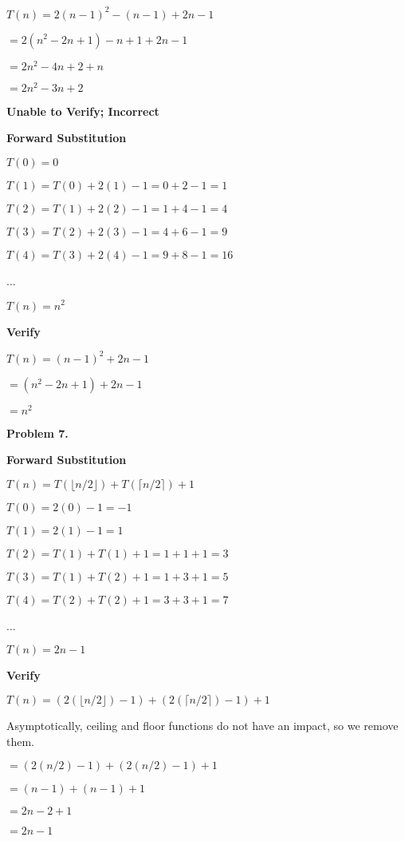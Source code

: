 \documentclass{article}
\begin{document}
	$T(n) = 2(n - 1)^2 - (n - 1) + 2n - 1$
	
	$ = 2(n^2 - 2n + 1) - n + 1 + 2n - 1$
	
	$ = 2n^2 - 4n + 2 + n$
	
	$ = 2n^2 - 3n + 2$
	
	\textbf{Unable to Verify; Incorrect}
	
	\textbf{Forward Substitution}
	
	$T(0) = 0$
	
	$T(1) = T(0) + 2(1) - 1 = 0 + 2 - 1 = 1$
	
	$T(2) = T(1) + 2(2) - 1 = 1 + 4 - 1 = 4$
	
	$T(3) = T(2) + 2(3) - 1 = 4 + 6 - 1 = 9$
	
	$T(4) = T(3) + 2(4) - 1 = 9 + 8 - 1 = 16$
	
	...
	
	$T(n) = n^2$
	
	\textbf{Verify}
	
	$T(n) = (n - 1)^2 + 2n - 1$
	
	$ = (n^2 - 2n + 1) + 2n - 1$
	
	$ = n^2$
	
	
	
\newpage

\textbf{Problem 7.}

	\textbf{Forward Substitution}

	$T(n) = T(\lfloor n/2 \rfloor) + T(\lceil n/2 \rceil) + 1$
	
	$T(0) = 2(0) - 1 = -1$
	
	$T(1) = 2(1) - 1 = 1$
	
	$T(2) = T(1) + T(1) + 1 = 1 + 1 + 1 = 3$
	
	$T(3) = T(1) + T(2) + 1 = 1 + 3 + 1 = 5$
	
	$T(4) = T(2) + T(2) + 1 = 3 + 3 + 1 = 7$
	
	...
	
	$T(n) = 2n - 1$
	
	\textbf{Verify}
	
	$T(n) = (2(\lfloor n/2 \rfloor) - 1) + (2(\lceil n/2 \rceil) - 1) + 1$
	
	Asymptotically, ceiling and floor functions do not have an impact, so we remove them.
	
	$ = (2 (n/2) - 1) + (2 (n/2) - 1) + 1$
	
	$ = (n - 1) + (n - 1) + 1$
	
	$ = 2n - 2 + 1$
	
	$ = 2n - 1$
	
	
\newpage
\end{document}
